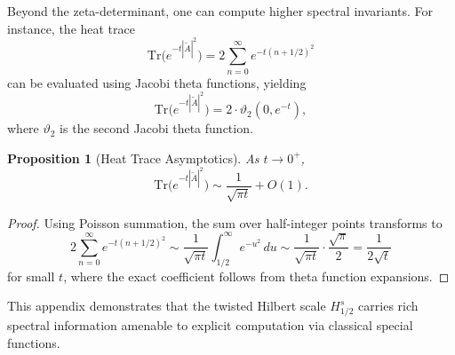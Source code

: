 \documentclass[11pt]{amsart}
\newtheorem{proposition}[theorem]{Proposition}
\theoremstyle{definition}
\theoremstyle{remark}
\begin{document}
Beyond the zeta-determinant, one can compute higher spectral invariants. For instance, the heat trace
\[
\text{Tr}\bigl(e^{-t|\widetilde{A}|^2}\bigr) = 2\sum_{n=0}^{\infty} e^{-t(n+1/2)^2}
\]
can be evaluated using Jacobi theta functions, yielding
\[
\text{Tr}\bigl(e^{-t|\widetilde{A}|^2}\bigr) = 2 \cdot \vartheta_2(0, e^{-t}),
\]
where $\vartheta_2$ is the second Jacobi theta function.

\begin{proposition}[Heat Trace Asymptotics]
As $t \to 0^+$,
\[
\text{Tr}\bigl(e^{-t|\widetilde{A}|^2}\bigr) \sim \frac{1}{\sqrt{\pi t}} + O(1).
\]
\end{proposition}

\begin{proof}
Using Poisson summation, the sum over half-integer points transforms to
\[
2\sum_{n=0}^{\infty} e^{-t(n+1/2)^2} \sim \frac{1}{\sqrt{\pi t}} \int_{1/2}^\infty e^{-u^2} \, du \sim \frac{1}{\sqrt{\pi t}} \cdot \frac{\sqrt{\pi}}{2} = \frac{1}{2\sqrt{t}}
\]
for small $t$, where the exact coefficient follows from theta function expansions.
\end{proof}

This appendix demonstrates that the twisted Hilbert scale $H^s_{1/2}$ carries rich spectral information amenable to explicit computation via classical special functions.
\end{document}
